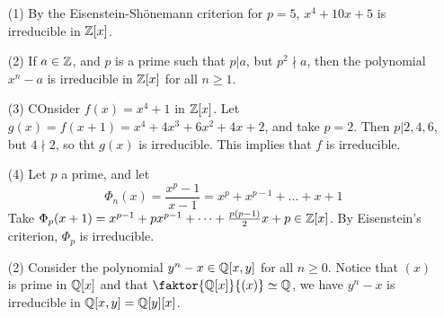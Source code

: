 \begin{example}\label{example_7.6}
    \begin{enumerate}
        \item[(1)] By the Eisenstein-Sh\"onemann criterion for $p=5$,
          $x^4+10x+5$ is irreducible in  $\mathbb{Z}[x]$.

        \item[(2)] If $a \in \mathbb{Z}$, and  $p$ is a prime such that  $p|a$, but $p^2
            \nmid a$, then the polynomial $x^n-a$ is irreducible in  $\mathbb{Z}[x]$ for
            all $n \geq 1$.

        \item[(3)] COnsider $f(x)=x^4+1$ in $\mathbb{Z}[x]$. Let
            $g(x)=f(x+1)=x^4+4x^3+6x^2+4x+2$, and take $p=2$. Then  $p|2,4,6$, but
            $4 \nmid 2$, so tht  $g(x)$ is irreducible. This implies that $f$ is
            irreducible.

        \item[(4)] Let $p$ a prime, and let
            \begin{equation*}
                \Phi_n(x)=\frac{x^p-1}{x-1}=x^p+x^{p-1}+\dots+x+1
            \end{equation*}
            Take $\Phi_p(x+1)=x^{p-1}+px^{p-1}+\dots+\frac{p(p-1)}{2}x+p \in \mathbb{Z}[x]$.
            By Eisenstein's criterion, $\Phi_p$ is irreducible.

        \item[(2)] Consider the polynomial $y^n-x \in \mathbb{Q}[x,y]$ for all $n \geq
            0$. Notice that  $(x)$ is prime in $\mathbb{Q}[x]$ and that
            $\faktor{\Q[x]}{(x)} \simeq \Q$, we have $y^n-x$ is irreducible in
            $\mathbb{Q}[x,y]=\mathbb{Q}[y][x]$.

    \end{enumerate}
\end{example}
